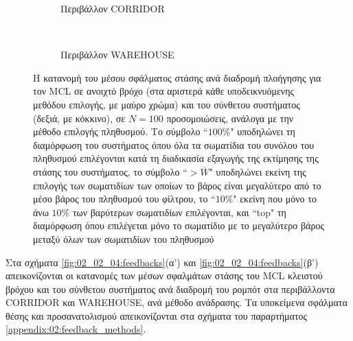 \begin{figure}
  \vspace{2cm}
  \begin{subfigure}{\linewidth}
  \hspace{-1.25cm}
    
    \vspace{0.3cm}
    \caption{Περιβάλλον CORRIDOR}
    \label{fig:02_02_04:corridor_selections}
  \end{subfigure}\\
  \begin{subfigure}{\linewidth}\vspace{0.5cm}
    \hspace{-1.25cm}
    
    \vspace{0.3cm}
    \caption{Περιβάλλον WAREHOUSE}
    \label{fig:02_02_04:warehouse_selections}
  \end{subfigure}
\caption{\small Η κατανομή του μέσου σφάλματος στάσης ανά διαδρομή πλοήγησης
         για τον MCL σε ανοιχτό βρόχο (στα αριστερά κάθε υποδεικνυόμενης
         μεθόδου επιλογής, με μαύρο χρώμα) και του σύνθετου συστήματος (δεξιά,
         με κόκκινο), σε $N=100$ προσομοιώσεις, ανάλογα με την μέθοδο επιλογής
         πληθυσμού. Το σύμβολο ``$100\%$" υποδηλώνει τη διαμόρφωση του
         συστήματος όπου όλα τα σωματίδια του συνόλου του πληθυσμού επιλέγονται
         κατά τη διαδικασία εξαγωγής της εκτίμησης της στάσης του συστήματος,
         το σύμβολο ``$>\overline{W}$" υποδηλώνει εκείνη της επιλογής των
         σωματιδίων των οποίων το βάρος είναι μεγαλύτερο από το μέσο βάρος του
         πληθυσμού του φίλτρου, το ``$10\%$" εκείνη που μόνο το άνω $10\%$ των
         βαρύτερων σωματιδίων επιλέγονται, και ``top" τη διαμόρφωση όπου
         επιλέγεται μόνο το σωματίδιο με το μεγαλύτερο βάρος μεταξύ όλων των
         σωματιδίων του πληθυσμού}
\label{fig:02_02_04:selections}
\end{figure}

Στα σχήματα \ref{fig:02_02_04:feedbacks}(α') και
\ref{fig:02_02_04:feedbacks}(β') απεικονίζονται οι κατανομές των μέσων
σφαλμάτων στάσης του MCL κλειστού βρόχου και του σύνθετου συστήματος ανά
διαδρομή του ρομπότ στα περιβάλλοντα CORRIDOR και WAREHOUSE, ανά μέθοδο
ανάδρασης. Τα υποκείμενα σφάλματα θέσης και προσανατολισμού απεικονίζονται στα
σχήματα του παραρτήματος \ref{appendix:02:feedback_methods}.

